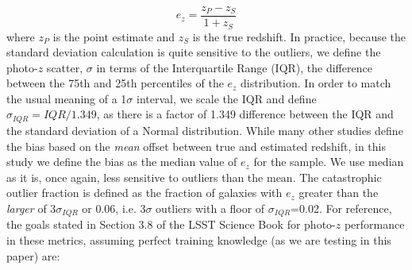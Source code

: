 \begin{equation}
e_{z} = \frac{z_{P} -z_{S}}{1+z_{S}}
\end{equation}
where $z_{P}$ is the point estimate and $z_{S}$ is the true redshift.
In practice, because the standard deviation calculation is quite sensitive to the outliers, we define the photo-$z$ scatter, $\sigma$ in terms of the Interquartile Range (IQR), the difference between the 75th and 25th percentiles of the $e_{z}$ distribution.  In order to match the usual meaning of a 1$\sigma$ interval, we scale the IQR and define $\sigma_{IQR} = IQR/1.349$, as there is a factor of 1.349 difference between the IQR and the standard deviation of a Normal distribution.
While many other studies define the bias based on the {\it mean} offset between true and estimated redshift, in this study we define the bias as the median value of $e_{z}$ for the sample.  We use median as it is, once again, less sensitive to outliers than the mean.  The catastrophic outlier fraction is defined as the fraction of galaxies with $e_{z}$ greater than the {\it larger} of $3\sigma_{IQR}$ or 0.06, i.e. 3$\sigma$ outliers with a floor of $\sigma_{IQR}$=0.02.
For reference, the goals stated in Section 3.8 of the LSST Science Book \citep{Abell:09} for photo-$z$ performance in these metrics, assuming perfect training knowledge (as we are testing in this paper) are:
